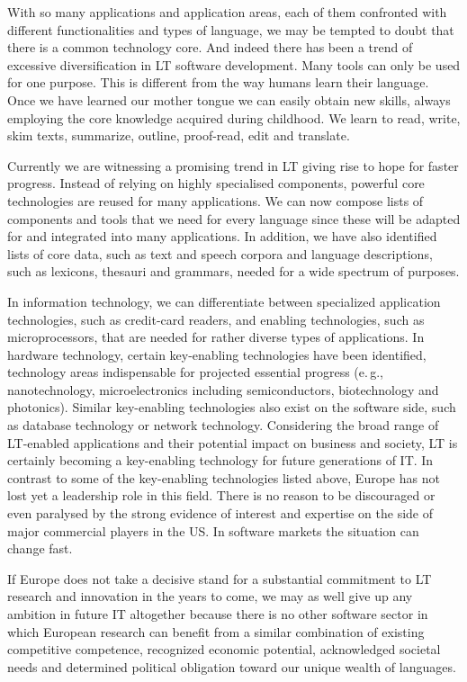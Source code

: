 \documentclass[10pt, plain]{../../metanetpaper}
\begin{document}
\begin{multicols}{2}
With so many applications and application areas, each of them confronted with different functionalities and types of language, we may be tempted to doubt that there is a common technology core. And indeed there has been a trend of excessive diversification in LT software development. Many tools can only be used for one purpose. This is different from the way humans learn their language. Once we have learned our mother tongue we can easily obtain new skills, always employing the core knowledge acquired during childhood. We learn to read, write, skim texts, summarize, outline, proof-read, edit and translate.
 
Currently we are witnessing a promising trend in LT giving rise to hope for faster progress. Instead of relying on highly specialised components, powerful core technologies are reused for many applications. We can now compose lists of components and tools that we need for every language since these will be adapted for and integrated into many applications. In addition, we have also identified lists of core data, such as text and speech corpora and language descriptions, such as lexicons, thesauri and grammars, needed for a wide spectrum of purposes.


In information technology, we can differentiate between specialized application technologies, such as credit-card readers, and enabling technologies, such as microprocessors, that are needed for rather diverse types of applications. In hardware technology, certain key-enabling technologies have been identified, technology areas indispensable for projected essential progress (e.\,g., nanotechnology, microelectronics including semiconductors, biotechnology and photonics). Similar key-enabling technologies also exist on the software side, such as database technology or network technology. Considering the broad range of LT-enabled applications and their potential impact on business and society, LT is certainly becoming a key-enabling technology for future generations of IT. In contrast to some of the key-enabling technologies listed above, Europe has not lost yet a leadership role in this field. There is no reason to be discouraged or even paralysed by the strong evidence of interest and expertise on the side of major commercial players in the US. In software markets the situation can change fast.
 
If Europe does not take a decisive stand for a substantial commitment to LT research and innovation in the years to come, we may as well give up any ambition in future IT altogether because there is no other software sector in which European research can benefit from a similar combination of existing competitive competence, recognized economic potential, acknowledged societal needs and determined political obligation toward our unique wealth of languages.
\end{multicols}
\end{document}
